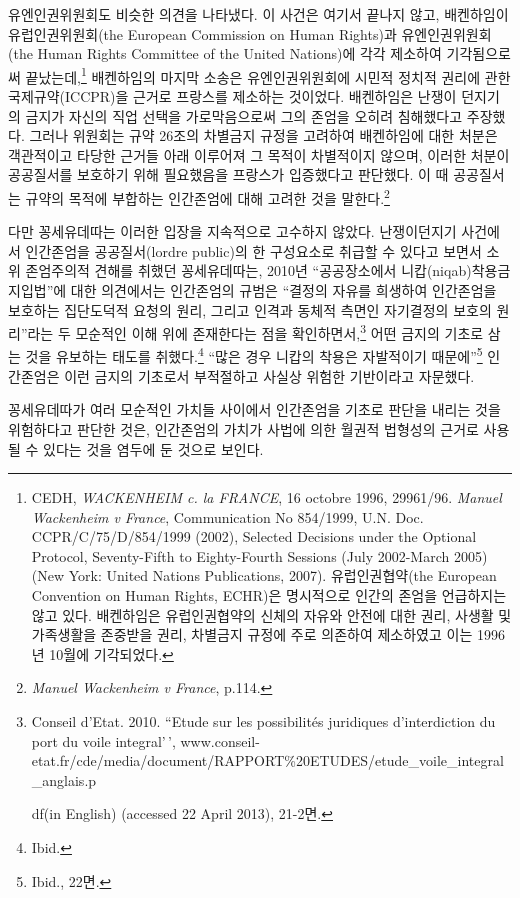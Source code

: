 유엔인권위원회도 비슷한 의견을 나타냈다. 이 사건은 여기서 끝나지 않고, 배켄하임이 유럽인권위원회(the European Commission on Human Rights)과 유엔인권위원회(the Human Rights Committee of the United Nations)에 각각 제소하여 기각됨으로써 끝났는데,\footnote{CEDH, \emph{WACKENHEIM c. la FRANCE}, 16 octobre 1996, 29961/96. \emph{Manuel Wackenheim v France}, Communication No 854/1999, U.N. Doc. CCPR/C/75/D/854/1999 (2002), Selected Decisions under the Optional Protocol, Seventy-Fifth to Eighty-Fourth Sessions (July 2002-March 2005) (New York: United Nations Publications, 2007). 유럽인권협약(the European Convention on Human Rights, ECHR)은 명시적으로 인간의 존엄을 언급하지는 않고 있다. 배켄하임은 유럽인권협약의 신체의 자유와 안전에 대한 권리, 사생활 및 가족생활을 존중받을 권리, 차별금지 규정에 주로 의존하여 제소하였고 이는 1996년 10월에 기각되었다.} 배켄하임의 마지막 소송은 유엔인권위원회에 시민적 정치적 권리에 관한 국제규약(ICCPR)을 근거로 프랑스를 제소하는 것이었다. 배켄하임은 난쟁이 던지기의 금지가 자신의 직업 선택을 가로막음으로써 그의 존엄을 오히려 침해했다고 주장했다. 그러나 위원회는 규약 26조의 차별금지 규정을 고려하여 배켄하임에 대한 처분은 객관적이고 타당한 근거들 아래 이루어져 그 목적이 차별적이지 않으며, 이러한 처분이 공공질서를 보호하기 위해 필요했음을 프랑스가 입증했다고 판단했다. 이 때 공공질서는 규약의 목적에 부합하는 인간존엄에 대해 고려한 것을 말한다.\footnote{\emph{Manuel Wackenheim v France}, p.114.}

다만 꽁세유데따는 이러한 입장을 지속적으로 고수하지 않았다. 난쟁이던지기 사건에서 인간존엄을 공공질서(l\textquotesingle ordre public)의 한 구성요소로 취급할 수 있다고 보면서 소위 존엄주의적 견해를 취했던 꽁세유데따는, 2010년 ``공공장소에서 니캅(niqab)착용금지입법''에 대한 의견에서는 인간존엄의 규범은 ``결정의 자유를 희생하여 인간존엄을 보호하는 집단도덕적 요청의 원리, 그리고 인격과 동체적 측면인 자기결정의 보호의 원리''라는 두 모순적인 이해 위에 존재한다는 점을 확인하면서,\footnote{Conseil d'Etat. 2010. ``Etude sur les possibilités juridiques d'interdiction du port du voile integral'\,', www.conseil-etat.fr/cde/media/document/RAPPORT\%20ETUDES/etude\_voile\_integral\_anglais.p

  df(in English) (accessed 22 April 2013), 21-2면.} 어떤 금지의 기초로 삼는 것을 유보하는 태도를 취했다.\footnote{Ibid.} ``많은 경우 니캅의 착용은 자발적이기 때문에''\footnote{Ibid., 22면.} 인간존엄은 이런 금지의 기초로서 부적절하고 사실상 위험한 기반이라고 자문했다.

꽁세유데따가 여러 모순적인 가치들 사이에서 인간존엄을 기초로 판단을 내리는 것을 위험하다고 판단한 것은, 인간존엄의 가치가 사법에 의한 월권적 법형성의 근거로 사용될 수 있다는 것을 염두에 둔 것으로 보인다.

